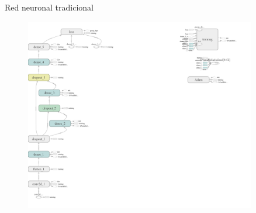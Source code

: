 \documentclass[10pt]{beamer}
\begin{document}
\begin{frame}{Red neuronal tradicional}
    \begin{figure}[!ht] 
        \centering
        \includegraphics[width=0.9\textwidth]{../img/arqdense}
    \end{figure}

\end{frame}
\end{document}
